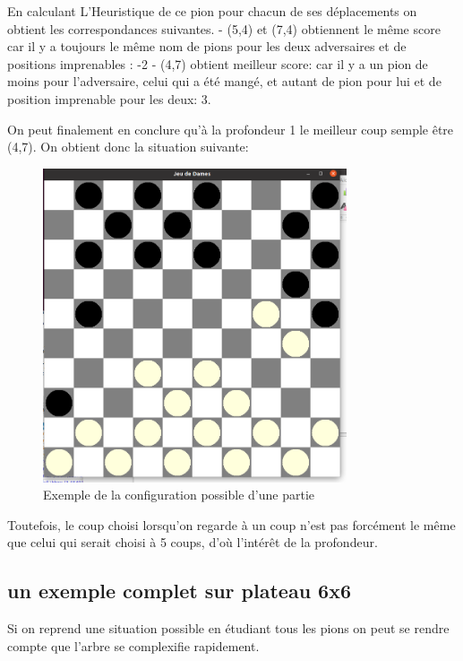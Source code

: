 \documentclass[12,french]{report}
\begin{document}
En calculant L'Heuristique de ce pion pour chacun de ses déplacements on obtient les correspondances suivantes.
- (5,4) et (7,4) obtiennent le même score car il y a toujours le même nom de pions pour les deux adversaires et de positions imprenables : -2
- (4,7) obtient meilleur score: car il y a un pion de moins pour l'adversaire, celui qui a été mangé, et autant de pion pour lui et de position imprenable pour les deux: 3.




On peut finalement en conclure qu'à la profondeur 1 le meilleur coup semple être (4,7). On obtient donc la situation suivante:

\begin{figure}[H]
	\center
	\includegraphics[width=0.8\textwidth]{./Images/image2heuristique} 
	\caption{Exemple de la configuration possible d'une partie}
\end{figure}\vspace{0.2cm}

Toutefois, le coup choisi lorsqu'on regarde à un coup n'est pas forcément le même que celui qui serait choisi à 5 coups, d'où l'intérêt de la profondeur.

\subsection{un exemple complet sur plateau 6x6}
Si on reprend une situation possible en étudiant tous les pions on peut se rendre compte que l'arbre se complexifie rapidement. 
\end{document}
